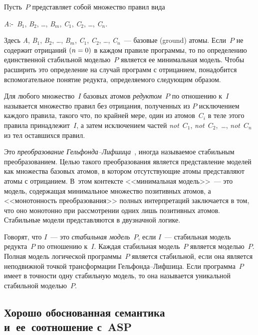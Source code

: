 \begin{multicols}{2}
Пусть~$P$ представляет собой множество правил вида

\begin{center}
\textit{A}:\;-\ \textit{B}$_1$, \textit{B}$_2$, \ldots , \textit{B}$_m$, 
\textit{C}$_1$, \textit{C}$_2$, \ldots , \textit{C}$_n$.
\end{center}

\noindent
Здесь \textit{A}, \textit{B}$_1$, \textit{B}$_2$, \ldots , \textit{B}$_m$, 
\textit{C}$_1$, \textit{C}$_2$, \ldots , \textit{C}$_n$~--- базовые (ground) атомы. 
Если~$P$ не 
содержит отрицаний $(n \hm= 0)$ в каждом правиле программы, то по определению 
единственной стабильной моделью~$P$ является ее минимальная модель. Чтобы 
расширить это определение на случай программ с отрицанием, понадобится 
вспомогательное понятие редукта, определяемого следующим образом.

Для любого множество~$I$ базовых атомов \textit{редуктом}~$P$ по отношению к~$I$ 
называется множество правил без отрицания, полученных из $P$ исключением каждого 
правила, такого что, по крайней мере, один из атомов~$C_i$ в теле этого правила 
принадлежит~$I$, а затем исключением частей \textit{not}~$C_1$, \textit{not}~$C_2$,\ \ldots , 
\textit{not}~$C_n$ из тел оставшихся правил.

Это \textit{преобразование Гельфонда--Лифшица}~\cite{32kal}, иногда называемое 
стабильным преобразованием. Целью такого преобразования является пред\-став\-ле\-ние 
моделей как множества базовых атомов, в котором отсутствующие атомы представляют 
атомы с отрицанием. В~этом контексте <<минимальная модель>>~--- это модель, 
содержащая минимальное множество позитивных атомов, а <<монотонность 
преобразования>> полных интерпретаций заключается в том, что оно монотонно при 
рассмотрении одних лишь позитивных атомов. Стабильные модели представляются в 
двузначной логике.

Говорят, что $I$~--- это \textit{стабильная модель}~$P$, если $I$~--- стабильная модель 
редукта~$P$ по отношению к~$I$. Каждая стабильная модель~$P$ является моделью~$P$. 
Полная модель логической программы~$P$ является стабильной, если она является 
неподвижной точкой трансформации Гельфонда--Лифшица. Если программа~$P$ имеет в 
точности одну стабильную модель, то она называется уникальной стабильной 
моделью~$P$.
   
   \subsection{Хорошо обоснованная семантика и~ее~соотношение с~ASP} %


\end{multicols}
